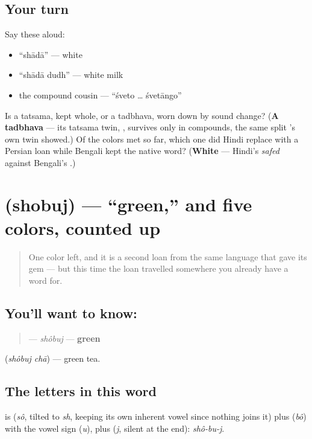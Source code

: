 \subsection*{Your turn}
Say these aloud:

\begin{itemize}
\raggedright
  \item \textquotedblleft{}shādā\textquotedblright{} — white
  \item \textquotedblleft{}shādā dudh\textquotedblright{} — white milk
  \item the compound cousin — \textquotedblleft{}śveto … śvetāngo\textquotedblright{}
\end{itemize}

\begin{tcolorbox}[breakable,colback=teal!4,colframe=teal!35!black,title={Before you move on}]
Is  a tatsama, kept whole, or a tadbhava, worn down by sound change? (\textbf{A tadbhava} — its tatsama twin, , survives only in compounds, the same split 's own twin showed.) Of the colors met so far, which one did Hindi replace with a Persian loan while Bengali kept the native word? (\textbf{White} — Hindi's \emph{safed} against Bengali's .)
\end{tcolorbox}
\section[shobuj]{ (shobuj) — \textquotedblleft{}green,\textquotedblright{} and five colors, counted up}

\label{lesson:BN-C14-shobuj}



\begin{quote}
One color left, and it is a second loan from the same language that gave  its gem — but this time the loan travelled somewhere you already have a word for.
\end{quote}

\subsection*{You'll want to know: }
\begin{quote}
\textbf{} — \emph{shôbuj} — \textbf{green}
\end{quote}

  (\emph{shôbuj chā}) — green tea.

\subsection*{The letters in this word}
\textbf{} is \textbf{} (\emph{sô}, tilted to \emph{sh}, keeping its own inherent vowel since nothing joins it) plus \textbf{} (\emph{bô}) with the vowel sign \textbf{} (\emph{u}), plus \textbf{} (\emph{j}, silent at the end): \emph{shô-bu-j}.

